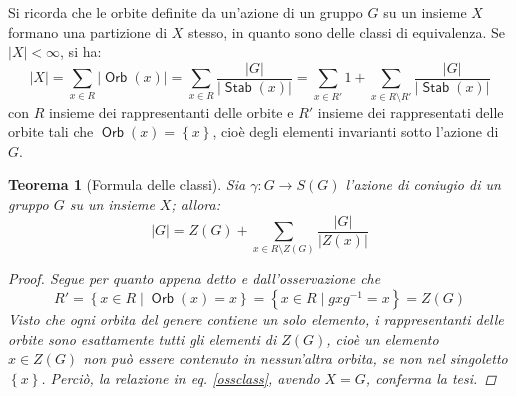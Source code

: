 \documentclass[11pt]{scrartcl}
\theoremstyle{style1}
\newtheorem{teorema}{Teorema}[section]
\numberwithin{equation}{subsection}
\renewcommand{\operatorname}[1]{\mathop{\mathrm{\textsf{#1}}}}
\begin{document}
Si ricorda che le orbite definite da un'azione di un gruppo $G$ su un insieme $X$ formano una partizione di $X$ stesso, in quanto sono delle classi di equivalenza.
Se $\lvert X \rvert < \infty$, si ha:
\begin{equation}\label{ossclass}
\lvert X \rvert  = \sum_{x \in R}^{} \lvert \operatorname{Orb} (x) \rvert = \sum_{x \in R}^{} \frac{\lvert G \rvert }{\lvert \operatorname{Stab} (x) \rvert } = \sum_{x \in R'}^{} 1 + \sum_{x \in R \setminus R '}^{} \frac{\lvert G \rvert }{\lvert \operatorname{Stab} (x) \rvert }
\end{equation}
con $R$ insieme dei rappresentanti delle orbite e $R'$ insieme dei rappresentati delle orbite tali che $\operatorname{Orb} (x) = \left\{ x \right\} $, cio\`e degli elementi invarianti sotto l'azione di $G$. 
\begin{teorema}
	[Formula delle classi]
	Sia $\gamma:G \to S(G)$ l'azione di coniugio di un gruppo $G$ su un insieme $X$; allora:
	\begin{equation*}
		\lvert G \rvert  = Z(G) + \sum_{x \in R \setminus Z(G)}^{} \frac{\lvert G \rvert }{\lvert Z(x) \rvert }
	\end{equation*}
	\begin{proof}
		Segue per quanto appena detto e dall'osservazione che
		\[
		R' = \left\{ x \in R  \mid \operatorname{Orb} (x) = x \right\} = \left\{ x \in R  \mid gxg^{-1} = x \right\} = Z(G)
		\] 
		Visto che ogni orbita del genere contiene un solo elemento, i rappresentanti delle orbite sono esattamente tutti gli elementi di $Z(G)$, cio\`e un elemento $x \in Z(G)$ non pu\`o essere contenuto in nessun'altra orbita, se non nel singoletto $\left\{ x \right\} $.
		Perci\`o, la relazione in eq. \ref{ossclass}, avendo $X=G$, conferma la tesi.
	\end{proof}
\end{teorema}
\end{document}
